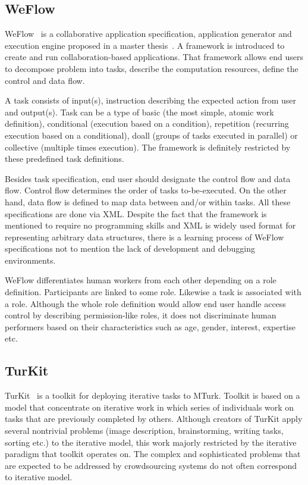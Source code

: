 \subsection{WeFlow}
WeFlow~\cite{Kokciyan2012} is a collaborative application specification, 
application generator and execution engine proposed in a master thesis~\cite{Kokciyan}. 
A framework is introduced to create and run collaboration-based applications. 
That framework allows end users to decompose problem into tasks, 
describe the computation resources, define the control and data flow.

A task consists of input(s), instruction describing the expected action from user 
and output(s). Task can be a type of basic (the most simple, atomic work definition), 
conditional (execution based on a condition), repetition (recurring execution based 
on a conditional), doall (groups of tasks executed in parallel) or collective 
(multiple times execution). The framework is definitely restricted by 
these predefined task definitions.

Besides task specification, end user should designate the control flow and 
data flow. Control flow determines the order of tasks to-be-executed. 
On the other hand, data flow is defined to map data between and/or within tasks. 
All these specifications are done via XML. Despite the fact that the framework 
is mentioned to require no programming skills and XML is widely used format 
for representing arbitrary data structures, there is a learning process of 
WeFlow specifications not to mention the lack of development 
and debugging environments.

WeFlow differentiates human workers from each other depending on a 
role definition. Participants are linked to some role. Likewise a task is associated 
with a role. Although the whole role definition would allow end user handle access 
control by describing permission-like roles, it does not discriminate human 
performers based on their characteristics such as age, gender, interest, expertise etc.


\subsection{TurKit}
TurKit~\cite{Little2009} is a toolkit for deploying iterative tasks to MTurk. 
Toolkit is based on a model that concentrate on iterative work in which series of 
individuals work on tasks that are previously completed by others. Although 
creators of TurKit apply several nontrivial problems (image description, 
brainstorming, writing tasks, sorting etc.) to the iterative model, this work 
majorly restricted by the iterative paradigm that toolkit operates on. The complex 
and sophisticated problems that are expected to be addressed by crowdsourcing 
systems do not often correspond to iterative model.

